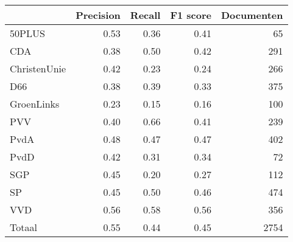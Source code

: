 \begin{tabular}{lrrrr}
\toprule
{} &  Precision &  Recall &  F1 score &  Documenten \\
\midrule
50PLUS       &       0.53 &    0.36 &      0.41 &          65 \\
CDA          &       0.38 &    0.50 &      0.42 &         291 \\
ChristenUnie &       0.42 &    0.23 &      0.24 &         266 \\
D66          &       0.38 &    0.39 &      0.33 &         375 \\
GroenLinks   &       0.23 &    0.15 &      0.16 &         100 \\
PVV          &       0.40 &    0.66 &      0.41 &         239 \\
PvdA         &       0.48 &    0.47 &      0.47 &         402 \\
PvdD         &       0.42 &    0.31 &      0.34 &          72 \\
SGP          &       0.45 &    0.20 &      0.27 &         112 \\
SP           &       0.45 &    0.50 &      0.46 &         474 \\
VVD          &       0.56 &    0.58 &      0.56 &         356 \\
Totaal       &       0.55 &    0.44 &      0.45 &        2754 \\
\bottomrule
\end{tabular}
